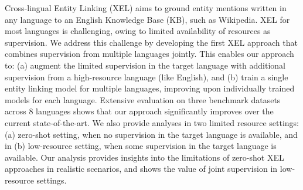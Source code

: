 Cross-lingual Entity Linking (XEL) aims to ground entity mentions written in any language to an English Knowledge Base (KB), such as Wikipedia. XEL for most languages is challenging, owing to limited availability of resources as supervision. We address this challenge by developing the first XEL approach that combines supervision from multiple languages jointly. This enables our approach to: (a) augment the limited supervision in the target language with additional supervision from a high-resource language (like English), and (b) train a single entity linking model for multiple languages, improving upon individually trained models for each language. Extensive evaluation on three benchmark datasets across 8 languages shows that our approach significantly improves over the current state-of-the-art. We also provide analyses in two limited resource settings: (a) zero-shot setting, when no supervision in the target language is available, and in (b) low-resource setting, when some supervision in the target language is available. Our analysis provides insights into the limitations of zero-shot XEL approaches in realistic scenarios, and shows the value of joint supervision in low-resource settings.

